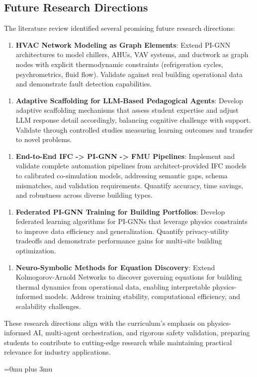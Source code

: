 \documentclass[12pt,a4paper]{article}
\begin{document}
\subsection{Future Research Directions}
The literature review identified several promising future research directions:
\begin{enumerate}
  \item \textbf{HVAC Network Modeling as Graph Elements}: Extend PI-GNN architectures to model chillers, AHUs, VAV systems, and ductwork as graph nodes with explicit thermodynamic constraints (refrigeration cycles, psychrometrics, fluid flow). Validate against real building operational data and demonstrate fault detection capabilities.
\end{enumerate}
\begin{enumerate}[resume]
  \item \textbf{Adaptive Scaffolding for LLM-Based Pedagogical Agents}: Develop adaptive scaffolding mechanisms that assess student expertise and adjust LLM response detail accordingly, balancing cognitive challenge with support. Validate through controlled studies measuring learning outcomes and transfer to novel problems.
\end{enumerate}
\begin{enumerate}[resume]
  \item \textbf{End-to-End IFC -> PI-GNN -> FMU Pipelines}: Implement and validate complete automation pipelines from architect-provided IFC models to calibrated co-simulation models, addressing semantic gaps, schema mismatches, and validation requirements. Quantify accuracy, time savings, and robustness across diverse building types.
\end{enumerate}
\begin{enumerate}[resume]
  \item \textbf{Federated PI-GNN Training for Building Portfolios}: Develop federated learning algorithms for PI-GNNs that leverage physics constraints to improve data efficiency and generalization. Quantify privacy-utility tradeoffs and demonstrate performance gains for multi-site building optimization.
\end{enumerate}
\begin{enumerate}[resume]
    \item \textbf{Neuro-Symbolic Methods for Equation Discovery}: Extend
      Kolmogorov-Arnold Networks to discover governing equations for building
      thermal dynamics from operational data, enabling interpretable
      physics-informed models. Address training stability, computational
      efficiency, and scalability challenges.
\end{enumerate}
These research directions align with the curriculum's emphasis on physics-informed AI, multi-agent orchestration, and rigorous safety validation, preparing students to contribute to cutting-edge research while maintaining practical relevance for industry applications.

\begingroup
\setlength{\emergencystretch}{4em}
\Urlmuskip=0mu plus 3mu\relax
\sloppy
\raggedright

\endgroup
\end{document}
